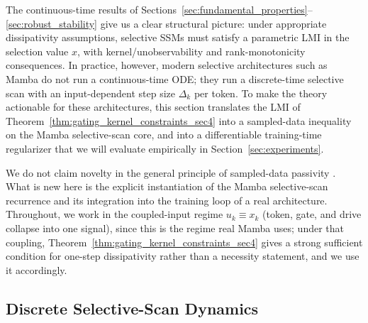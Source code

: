 \documentclass[10pt]{article} %
\theoremstyle{definition}
\begin{document}
The continuous-time results of Sections~\ref{sec:fundamental_properties}--\ref{sec:robust_stability} give us a clear structural picture: under appropriate dissipativity assumptions, selective SSMs must satisfy a parametric LMI in the selection value $x$, with kernel/unobservability and rank-monotonicity consequences. In practice, however, modern selective architectures such as Mamba \citep{gu2024mamba} do not run a continuous-time ODE; they run a discrete-time selective scan with an input-dependent step size $\Delta_k$ per token. To make the theory actionable for these architectures, this section translates the LMI of Theorem~\ref{thm:gating_kernel_constraints_sec4} into a sampled-data inequality on the Mamba selective-scan core, and into a differentiable training-time regularizer that we will evaluate empirically in Section~\ref{sec:experiments}.

We do not claim novelty in the general principle of sampled-data passivity \citep{liberzon2003switching, anderson2013network}. What is new here is the explicit instantiation of the Mamba selective-scan recurrence and its integration into the training loop of a real architecture. Throughout, we work in the coupled-input regime $u_k\equiv x_k$ (token, gate, and drive collapse into one signal), since this is the regime real Mamba uses; under that coupling, Theorem~\ref{thm:gating_kernel_constraints_sec4} gives a strong sufficient condition for one-step dissipativity rather than a necessity statement, and we use it accordingly.

\subsection{Discrete Selective-Scan Dynamics}
\label{subsec:discrete_dynamics}
\end{document}
